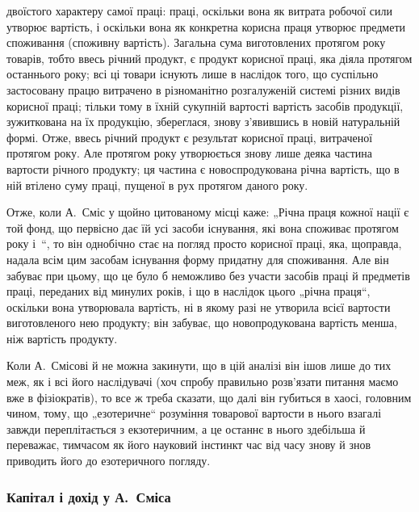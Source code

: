 \parcont{}  %
двоїстого характеру самої праці: праці, оскільки вона як витрата робочої сили утворює вартість, і
оскільки вона як конкретна корисна праця утворює предмети споживання (споживну вартість). Загальна
сума виготовлених протягом року товарів, тобто ввесь річний продукт, є продукт корисної праці, яка
діяла протягом останнього року; всі ці
товари існують лише в наслідок того, що суспільно застосовану працю витрачено в різноманітно
розгалуженій системі різних видів корисної праці; тільки тому в їхній сукупній вартості вартість
засобів продукції, зужиткована на їх продукцію, збереглася, знову з’явившись в новій натуральній
формі. Отже, ввесь річний продукт є результат корисної праці, витраченої протягом року. Але протягом
року утворюється знову лише деяка частина вартости річного продукту; ця частина є новоспродукована
річна вартість, що в ній втілено суму праці, пущеної в рух протягом даного року.

Отже, коли А.~Сміс у щойно цитованому місці каже: „Річна праця кожної нації є той фонд, що первісно
дає їй усі засоби існування, які вона споживає протягом року і~“, то він однобічно стає на
погляд просто корисної праці, яка, щоправда, надала всім цим засобам існування форму придатну для
споживання. Але він забуває при цьому, що це
було б неможливо без участи засобів праці й предметів праці, переданих від минулих років, і що в
наслідок цього „річна праця“, оскільки вона утворювала вартість, ні в якому разі не утворила всієї
вартости виготовленого нею продукту; він забуває, що новопродукована вартість менша, ніж вартість
продукту.

Коли А.~Смісові й не можна закинути, що в цій аналізі він ішов лише до тих меж, як і всі його
наслідувачі (хоч спробу правильно розв’язати питання маємо вже в фізіократів), то все ж треба
сказати, що далі він губиться в хаосі, головним чином, тому, що „езотеричне“ розуміння товарової
вартости в нього взагалі завжди переплітається з екзотеричним, а це останнє в нього здебільша й
переважає, тимчасом як його науковий інстинкт час від часу знову й знов приводить його до
езотеричного погляду.

\subsubsection{Капітал і дохід у А.~Сміса}

